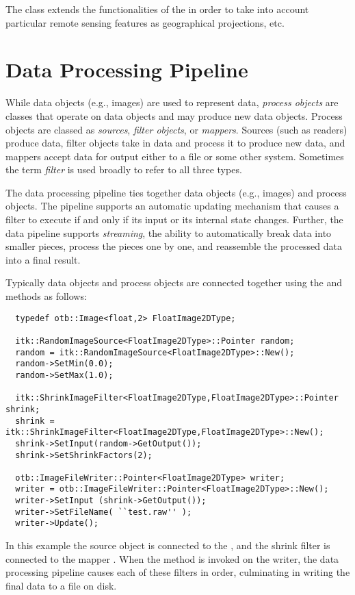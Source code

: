 The  class extends the functionalities of the
 in order to take into account particular remote
sensing features as geographical projections, etc.

\section{Data Processing Pipeline}
\label{sec:DataProcessingPipeline}



While data objects (e.g., images) are used to represent data,
\emph{process objects} are classes that operate on data objects and may
produce new data objects. Process objects are classed as
\emph{sources}, \emph{filter objects}, or \emph{mappers}.  Sources (such as
readers) produce data, filter objects take in data and process it to produce
new data, and mappers accept data for output either to a file or
some other system.  Sometimes the term \emph{filter} is used broadly
to refer to all three types.


The data processing pipeline ties together data objects (e.g., images)
and process objects. The pipeline supports an automatic updating
mechanism that causes a filter to execute if and only if its input 
or its internal state changes. Further, the data pipeline supports
\emph{streaming}, the ability to automatically break data into smaller
pieces, process the pieces one by one, and reassemble the processed data into
a final result.

Typically data objects and process objects are connected together using the
 and  methods as follows:

\small
\begin{verbatim}
  typedef otb::Image<float,2> FloatImage2DType;

  itk::RandomImageSource<FloatImage2DType>::Pointer random;
  random = itk::RandomImageSource<FloatImage2DType>::New();
  random->SetMin(0.0);
  random->SetMax(1.0);

  itk::ShrinkImageFilter<FloatImage2DType,FloatImage2DType>::Pointer shrink;
  shrink = itk::ShrinkImageFilter<FloatImage2DType,FloatImage2DType>::New();
  shrink->SetInput(random->GetOutput());
  shrink->SetShrinkFactors(2);

  otb::ImageFileWriter::Pointer<FloatImage2DType> writer;
  writer = otb::ImageFileWriter::Pointer<FloatImage2DType>::New();
  writer->SetInput (shrink->GetOutput());
  writer->SetFileName( ``test.raw'' );
  writer->Update();
\end{verbatim}
\normalsize 

In this example the source object  is connected
to the , and the shrink filter is connected to
the mapper . When the  method is
invoked on the writer, the data processing pipeline causes each of these
filters in order, culminating in writing the final data to a file on disk.
